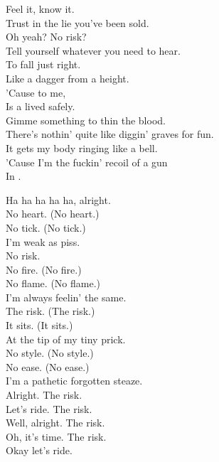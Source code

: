 


Feel it, know it. \\
Trust in the lie you've been sold. \\
Oh yeah? No risk? \\
Tell yourself whatever you need to hear. \\
To fall just right. \\
Like a dagger from a height. \\
'Cause  to me, \\
Is a  lived safely. \\

Gimme something to thin the blood. \\
There's nothin' quite like diggin' graves for fun. \\
It gets my body ringing like a bell. \\
'Cause I'm the fuckin' recoil of a gun \\
In . \\


Ha ha ha ha ha, alright. \\
No heart. (No heart.) \\
No tick. (No tick.) \\
I'm weak as piss. \\
No risk. \\
No fire. (No fire.) \\
No flame. (No flame.) \\
I'm always feelin' the same. \\

The risk. (The risk.) \\
It sits. (It sits.) \\
At the tip of my tiny prick. \\
No style. (No style.) \\
No ease. (No ease.) \\
I'm a pathetic forgotten steaze. \\

Alright. The risk. \\
Let's ride. The risk. \\
Well, alright. The risk. \\
Oh, it's time. The risk. \\
Okay let's ride. \\

